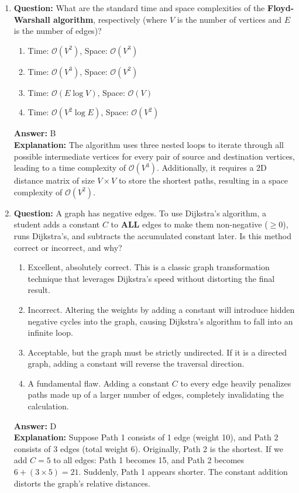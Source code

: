 \begin{enumerate}[label=\arabic*., itemsep=1.5em]
    \item \textbf{Question:} What are the standard time and space complexities of the \textbf{Floyd-Warshall algorithm}, respectively (where $V$ is the number of vertices and $E$ is the number of edges)?
    \begin{enumerate}[label=\Alph*.]
        \item Time: $\mathcal{O}(V^2)$, Space: $\mathcal{O}(V^3)$
        \item Time: $\mathcal{O}(V^3)$, Space: $\mathcal{O}(V^2)$
        \item Time: $\mathcal{O}(E \log V)$, Space: $\mathcal{O}(V)$
        \item Time: $\mathcal{O}(V^2 \log E)$, Space: $\mathcal{O}(V^2)$
    \end{enumerate}
    \textbf{Answer:} B \\
    \textbf{Explanation:} The algorithm uses three nested loops to iterate through all possible intermediate vertices for every pair of source and destination vertices, leading to a time complexity of $\mathcal{O}(V^3)$. Additionally, it requires a 2D distance matrix of size $V \times V$ to store the shortest paths, resulting in a space complexity of $\mathcal{O}(V^2)$.

    \item \textbf{Question:} A graph has negative edges. To use Dijkstra's algorithm, a student adds a constant $C$ to \textbf{ALL} edges to make them non-negative ($\ge 0$), runs Dijkstra's, and subtracts the accumulated constant later. Is this method correct or incorrect, and why?
    \begin{enumerate}[label=\Alph*.]
        \item Excellent, absolutely correct. This is a classic graph transformation technique that leverages Dijkstra's speed without distorting the final result.
        \item Incorrect. Altering the weights by adding a constant will introduce hidden negative cycles into the graph, causing Dijkstra's algorithm to fall into an infinite loop.
        \item Acceptable, but the graph must be strictly undirected. If it is a directed graph, adding a constant will reverse the traversal direction.
        \item A fundamental flaw. Adding a constant $C$ to every edge heavily penalizes paths made up of a larger number of edges, completely invalidating the calculation.
    \end{enumerate}
    \textbf{Answer:} D \\
    \textbf{Explanation:} Suppose Path 1 consists of 1 edge (weight 10), and Path 2 consists of 3 edges (total weight 6). Originally, Path 2 is the shortest. If we add $C = 5$ to all edges: Path 1 becomes 15, and Path 2 becomes $6 + (3 \times 5) = 21$. Suddenly, Path 1 appears shorter. The constant addition distorts the graph's relative distances.


\end{enumerate}
